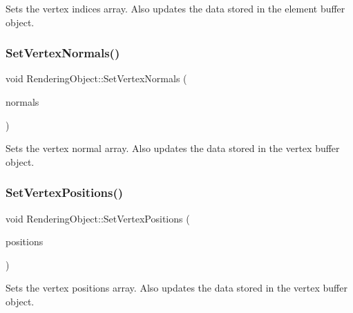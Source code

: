 Sets the vertex indices array. Also updates the data stored in the element buffer object. 

\hypertarget{class_rendering_object_a4cd085aed01fbc5e4fae7076e00919d3}{}\label{class_rendering_object_a4cd085aed01fbc5e4fae7076e00919d3} 
\subsubsection{\texorpdfstring{Set\+Vertex\+Normals()}{SetVertexNormals()}}
{\footnotesize\ttfamily void Rendering\+Object\+::\+Set\+Vertex\+Normals (\begin{DoxyParamCaption}\item[{std\+::unique\+\_\+ptr$<$ \hyperlink{class_rendering_object_a327c4d892de8d6138fb59afa6d078257}{Normal\+Array} $>$}]{normals }\end{DoxyParamCaption})\hspace{0.3cm}{\ttfamily [virtual]}}



Sets the vertex normal array. Also updates the data stored in the vertex buffer object. 

\hypertarget{class_rendering_object_ada51886b7da1924a17d3a55e8fe90061}{}\label{class_rendering_object_ada51886b7da1924a17d3a55e8fe90061} 
\subsubsection{\texorpdfstring{Set\+Vertex\+Positions()}{SetVertexPositions()}}
{\footnotesize\ttfamily void Rendering\+Object\+::\+Set\+Vertex\+Positions (\begin{DoxyParamCaption}\item[{std\+::unique\+\_\+ptr$<$ \hyperlink{class_rendering_object_a1223b9cf03f2029b9c43d71042c2a18e}{Position\+Array} $>$}]{positions }\end{DoxyParamCaption})\hspace{0.3cm}{\ttfamily [virtual]}}



Sets the vertex positions array. Also updates the data stored in the vertex buffer object. 

\hypertarget{class_rendering_object_a041c99c6f0d570bb7c36b9d2168f0b0d}{}\label{class_rendering_object_a041c99c6f0d570bb7c36b9d2168f0b0d} 
